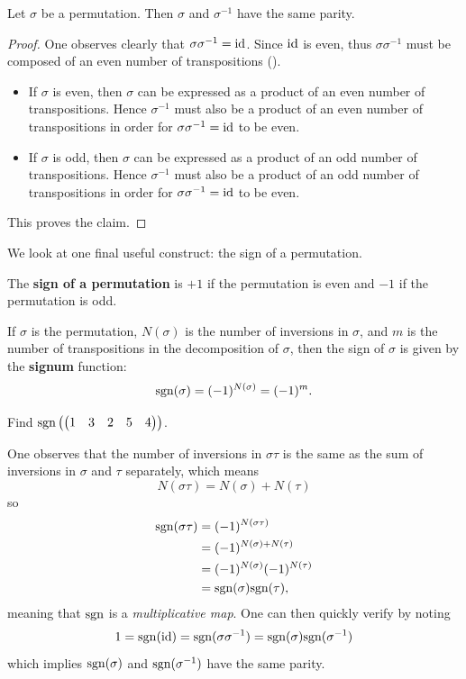 \begin{proposition}\label{prop-permutation-and-inverse-have-same-parity}
    Let $\sigma$ be a permutation. Then $\sigma$ and $\sigma^{-1}$ have the same parity.
\end{proposition}
\begin{proof}
    One observes clearly that $\sigma\sigma^{-1} = \mathrm{id}$. Since $\mathrm{id}$ is even, thus $\sigma\sigma^{-1}$ must be composed of an even number of transpositions ().
    \begin{itemize}
        \item If $\sigma$ is even, then $\sigma$ can be expressed as a product of an even number of transpositions. Hence $\sigma^{-1}$ must also be a product of an even number of transpositions in order for $\sigma\sigma^{-1} = \mathrm{id}$ to be even.
        \item If $\sigma$ is odd, then $\sigma$ can be expressed as a product of an odd number of transpositions. Hence $\sigma^{-1}$ must also be a product of an odd number of transpositions in order for $\sigma\sigma^{-1} = \mathrm{id}$ to be even.
    \end{itemize}
    This proves the claim.
\end{proof}

We look at one final useful construct: the sign of a permutation.
\begin{definition}
    The \textbf{sign of a permutation} is $+1$ if the permutation is even and $-1$ if the permutation is odd.
\end{definition}
If $\sigma$ is the permutation, $N(\sigma)$ is the number of inversions in $\sigma$, and $m$ is the number of transpositions in the decomposition of $\sigma$, then the sign of $\sigma$ is given by the \textbf{signum} function:
\[
    \mathrm{sgn}(\sigma) = (-1)^{N(\sigma)} = (-1)^m.
\]
\begin{exercise}
    Find $\mathrm{sgn}\left(\begin{pmatrix}1&3&2&5&4\end{pmatrix}\right)$.
\end{exercise}

One observes that the number of inversions in $\sigma\tau$ is the same as the sum of inversions in $\sigma$ and $\tau$ separately, which means
\[
    N(\sigma\tau) = N(\sigma) + N(\tau)
\]
so
\begin{align*}
    \mathrm{sgn}(\sigma\tau) &= (-1)^{N(\sigma\tau)}\\
    &= (-1)^{N(\sigma) + N(\tau)}\\
    &= (-1)^{N(\sigma)}(-1)^{N(\tau)}\\
    &= \mathrm{sgn}(\sigma)\mathrm{sgn}(\tau),
\end{align*}
meaning that $\mathrm{sgn}$ is a \textit{multiplicative map}. One can then quickly verify  by noting
\[
    1 = \mathrm{sgn}(\mathrm{id}) = \mathrm{sgn}(\sigma\sigma^{-1}) = \mathrm{sgn}(\sigma)\mathrm{sgn}(\sigma^{-1})
\]
which implies $\mathrm{sgn}(\sigma)$ and $\mathrm{sgn}(\sigma^{-1})$ have the same parity.

